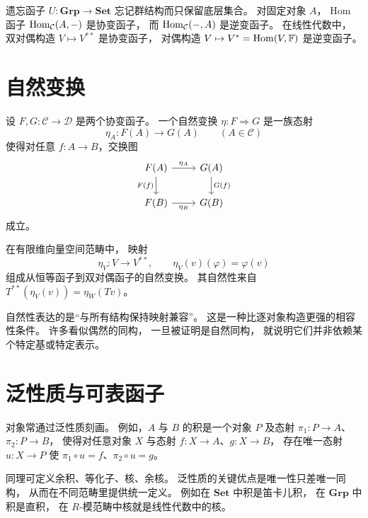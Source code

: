 \begin{example}
遗忘函子
$U:\mathbf{Grp}\to\mathbf{Set}$
忘记群结构而只保留底层集合。
对固定对象 $A$，
Hom 函子
$\mathrm{Hom}_{\mathcal{C}}(A,-)$ 是协变函子，
而 $\mathrm{Hom}_{\mathcal{C}}(-,A)$ 是逆变函子。
在线性代数中，
双对偶构造 $V\mapsto V^{**}$ 是协变函子，
对偶构造 $V\mapsto V^*=\mathrm{Hom}(V,\mathbb{F})$ 是逆变函子。
\end{example}

\section{自然变换}

\begin{definition}
设 $F,G:\mathcal{C}\to\mathcal{D}$ 是两个协变函子。
一个自然变换 $\eta:F\Rightarrow G$ 是一族态射
\[
\eta_A:F(A)\to G(A)\qquad (A\in\mathcal{C})
\]
使得对任意 $f:A\to B$，交换图
\[
\begin{tikzcd}
F(A) \arrow[r,"\eta_A"] \arrow[d,"F(f)"'] & G(A) \arrow[d,"G(f)"] \\
F(B) \arrow[r,"\eta_B"'] & G(B)
\end{tikzcd}
\]
成立。
\end{definition}

\begin{example}
在有限维向量空间范畴中，
映射
\[
\eta_V:V\to V^{**},\qquad
\eta_V(v)(\varphi)=\varphi(v)
\]
组成从恒等函子到双对偶函子的自然变换。
其自然性来自
$T^{**}(\eta_V(v))=\eta_W(Tv)$。
\end{example}

自然性表达的是“与所有结构保持映射兼容”。
这是一种比逐对象构造更强的相容性条件。
许多看似偶然的同构，
一旦被证明是自然同构，
就说明它们并非依赖某个特定基或特定表示。

\section{泛性质与可表函子}

\begin{definition}
对象常通过泛性质刻画。
例如，$A$ 与 $B$ 的积是一个对象 $P$ 及态射
$\pi_1:P\to A$、$\pi_2:P\to B$，
使得对任意对象 $X$ 与态射 $f:X\to A$、$g:X\to B$，
存在唯一态射 $u:X\to P$ 使
$\pi_1\circ u=f$、$\pi_2\circ u=g$。
\end{definition}

同理可定义余积、等化子、核、余核。
泛性质的关键优点是唯一性只差唯一同构，
从而在不同范畴里提供统一定义。
例如在 $\mathbf{Set}$ 中积是笛卡儿积，
在 $\mathbf{Grp}$ 中积是直积，
在 $R$-模范畴中核就是线性代数中的核。

